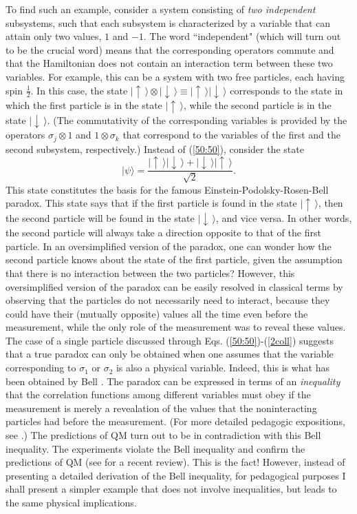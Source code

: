 \documentclass[12pt]{article}
\begin{document}
To find such an example, consider a system consisting of 
{\em two independent} subsystems, such that each subsystem
is characterized by a variable that can attain 
only two values, $1$ and $-1$. The word ``independent" 
(which will turn out to be the crucial word) means that the corresponding
operators commute and that the Hamiltonian does not contain 
an interaction term between these two variables. 
For example, this can be a system with two free particles, 
each having spin $\frac{1}{2}$. In this case, the state 
$|\!\uparrow\,\rangle \otimes |\!\downarrow\,\rangle
\equiv |\!\uparrow\,\rangle |\!\downarrow\,\rangle$
corresponds to the state in which the first particle is in the 
state $|\!\uparrow\,\rangle$, while the second particle 
is in the state $|\!\downarrow\,\rangle$. 
(The commutativity of the corresponding variables is 
provided by the operators $\sigma_j\otimes 1$ and 
$1\otimes\sigma_k$ that correspond to the variables of the 
first and the second subsystem, respectively.)   
Instead of (\ref{50:50}), consider the state 
\begin{equation}\label{EPR}
|\psi\rangle = \frac{
|\!\uparrow\,\rangle |\!\downarrow\,\rangle + 
|\!\downarrow\,\rangle |\!\uparrow\,\rangle }{\sqrt{2}} .
\end{equation}
This state constitutes the basis for the famous   
Einstein-Podolsky-Rosen-Bell paradox. This state says that 
if the first particle is found in the state $|\!\uparrow\,\rangle$,
then the second particle will be found in the state
$|\!\downarrow\,\rangle$, and vice versa. In other words,   
the second particle will always take a direction opposite
to that of the first particle. In an oversimplified version of 
the paradox, one can wonder how the second particle 
knows about the state of the first particle, given the 
assumption that there is no interaction between the two 
particles? However, this oversimplified version of the 
paradox can be easily resolved in classical terms by observing 
that the particles do not necessarily need to interact, because
they could have their (mutually opposite) values all the time 
even before the measurement, while the only role of the measurement 
was to reveal these values. The case of a single particle 
discussed through Eqs. (\ref{50:50})-(\ref{2coll}) suggests 
that a true paradox can only be obtained when one assumes 
that the variable corresponding to $\sigma_1$ or $\sigma_2$ 
is also a physical variable. Indeed, this is what has been obtained 
by Bell \cite{bell}. The paradox can be expressed in terms of 
an {\em inequality} that the correlation functions among different 
variables must obey if the measurement is merely a revealation 
of the values that the noninteracting particles had before 
the measurement. (For more detailed pedagogic expositions, 
see \cite{merm1,laloe}.)       
The predictions of QM turn out to be in contradiction with this 
Bell inequality. The experiments violate the Bell inequality
and confirm the predictions of QM (see \cite{genov} for a recent review).
This is the fact! However, 
instead of presenting a detailed derivation 
of the Bell inequality, for pedagogical purposes 
I shall present a simpler example 
that does not involve inequalities, but leads to the same
physical implications.
\end{document}
